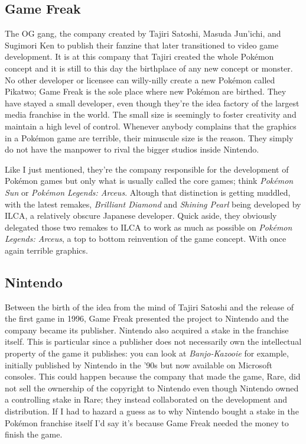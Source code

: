 \documentclass{book}
\begin{document}
\FloatBarrier\subsection*{Game Freak}
The OG gang, the company created by Tajiri Satoshi, Masuda Jun’ichi, and Sugimori Ken to publish their fanzine that later transitioned to video game development. It is at this company that Tajiri created the whole Pokémon concept and it is still to this day the birthplace of any new concept or monster. No other developer or licensee can willy-nilly create a new Pokémon called Pikatwo; Game Freak is the sole place where new Pokémon are birthed. They have stayed a small developer, even though they’re the idea factory of the largest media franchise in the world. The small size is seemingly to foster creativity and maintain a high level of control. Whenever anybody complains that the graphics in a Pokémon game are terrible, their minuscule size is the reason. They simply do not have the manpower to rival the bigger studios inside Nintendo.\par
Like I just mentioned, they’re the company responsible for the development of Pokémon games but only what is usually called the core games; think \emph{Pokémon Sun} or \emph{Pokémon Legends: Arceus}. Altough that distinction is getting muddled, with the latest remakes, \emph{Brilliant Diamond} and \emph{Shining Pearl} being developed by ILCA, a relatively obscure Japanese developer. Quick aside, they obviously delegated those two remakes to ILCA to work as much as possible on \emph{Pokémon Legends: Arceus}, a top to bottom reinvention of the game concept. With once again terrible graphics.\par
\FloatBarrier\subsection*{Nintendo}
Between the birth of the idea from the mind of Tajiri Satoshi and the release of the first game in 1996, Game Freak presented the project to Nintendo and the company became its publisher. Nintendo also acquired a stake in the franchise itself. This is particular since a publisher does not necessarily own the intellectual property of the game it publishes: you can look at \emph{Banjo-Kazooie} for example, initially published by Nintendo in the ’90s but now available on Microsoft consoles. This could happen because the company that made the game, Rare, did not sell the ownership of the copyright to Nintendo even though Nintendo owned a controlling stake in Rare; they instead collaborated on the development and distribution. If I had to hazard a guess as to why Nintendo bought a stake in the Pokémon franchise itself I’d say it’s because Game Freak needed the money to finish the game.\par
\end{document}
